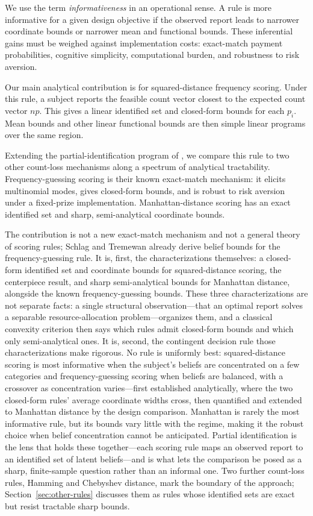 We use the term \emph{informativeness} in an operational sense.
A rule is more informative for a given design objective if the observed report leads to narrower coordinate bounds or narrower mean and functional bounds.
These inferential gains must be weighed against implementation costs: exact-match payment probabilities, cognitive simplicity, computational burden, and robustness to risk aversion.

Our main analytical contribution is for squared-distance frequency scoring.
Under this rule, a subject reports the feasible count vector closest to the expected count vector \(np\).
This gives a linear identified set and closed-form bounds for each \(p_i\).
Mean bounds and other linear functional bounds are then simple linear programs over the same region.

Extending the partial-identification program of \citet{SchlagTremewan2021}, we compare this rule to two other count-loss mechanisms along a spectrum of analytical tractability.
Frequency-guessing scoring is their known exact-match mechanism: it elicits multinomial modes, gives closed-form bounds, and is robust to risk aversion under a fixed-prize implementation.
Manhattan-distance scoring has an exact identified set and sharp, semi-analytical coordinate bounds.

The contribution is not a new exact-match mechanism and not a general theory of scoring rules; Schlag and Tremewan already derive belief bounds for the frequency-guessing rule.
It is, first, the characterizations themselves: a closed-form identified set and coordinate bounds for squared-distance scoring, the centerpiece result, and sharp semi-analytical bounds for Manhattan distance, alongside the known frequency-guessing bounds.
These three characterizations are not separate facts: a single structural observation---that an optimal report solves a separable resource-allocation problem---organizes them, and a classical convexity criterion then says which rules admit closed-form bounds and which only semi-analytical ones.
It is, second, the contingent decision rule those characterizations make rigorous.
No rule is uniformly best: squared-distance scoring is most informative when the subject's beliefs are concentrated on a few categories and frequency-guessing scoring when beliefs are balanced, with a crossover as concentration varies---first established analytically, where the two closed-form rules' average coordinate widths cross, then quantified and extended to Manhattan distance by the design comparison.
Manhattan is rarely the most informative rule, but its bounds vary little with the regime, making it the robust choice when belief concentration cannot be anticipated.
Partial identification is the lens that holds these together---each scoring rule maps an observed report to an identified set of latent beliefs---and is what lets the comparison be posed as a sharp, finite-sample question rather than an informal one.
Two further count-loss rules, Hamming and Chebyshev distance, mark the boundary of the approach; Section~\ref{sec:other-rules} discusses them as rules whose identified sets are exact but resist tractable sharp bounds.

